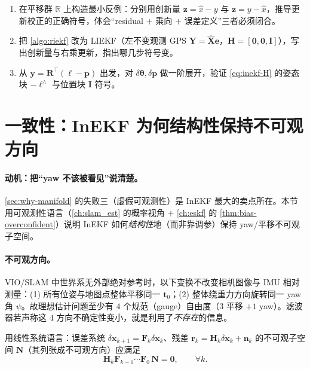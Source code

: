 \begin{practice}
\begin{enumerate}
  \item 在平移群 $\mathbb{R}$ 上构造最小反例：分别用创新量 $\mathbf{z}=\hat{x}-y$ 与 $\mathbf{z}=y-\hat{x}$，推导更新校正的正确符号，体会“residual $+$ 乘向 $+$ 误差定义”三者必须闭合。
  \item 把 \cref{algo:riekf} 改为 LIEKF（左不变观测 GPS $\mathbf{Y}=\hat{\mathbf{X}}\mathbf{e}$，$\mathbf{H}=[\mathbf{0},\mathbf{0},\mathbf{I}]$），写出创新量与右乘更新，指出哪几步符号变。
  \item 从 $\mathbf{y}=\mathbf{R}^\top(\boldsymbol{\ell}-\mathbf{p})$ 出发，对 $\delta\boldsymbol{\theta},\delta\mathbf{p}$ 做一阶展开，验证 \cref{eq:inekf-H} 的姿态块 $-\boldsymbol{\ell}^\wedge$ 与位置块 $\mathbf{I}$ 符号。
\end{enumerate}
\end{practice}

\section{一致性：InEKF 为何结构性保持不可观方向}
\label{sec:consistency-inekf}

\paragraph{动机：把“yaw 不该被看见”说清楚。}
\cref{sec:why-manifold} 的失败三（虚假可观测性）是 InEKF 最大的卖点所在。本节用可观测性语言（\cref{ch:slam_est} 的概率视角 $+$ \cref{ch:eskf} 的 \cref{thm:bias-overconfident}）说明 InEKF 如何\emph{结构性}地（而非靠调参）保持 yaw/平移不可观子空间。

\paragraph{不可观方向。}VIO/SLAM 中世界系无外部绝对参考时，以下变换不改变相机图像与 IMU 相对测量：(1) 所有位姿与地图点整体平移同一 $\mathbf{t}_0$；(2) 整体绕重力方向旋转同一 yaw 角 $\psi$。故理想估计问题至少有 $4$ 个规范（gauge）自由度（$3$ 平移 $+1$ yaw）。滤波器若声称这 $4$ 方向不确定性变小，就是利用了\emph{不存在}的信息。

用线性系统语言：误差系统 $\delta\mathbf{x}_{k+1}=\mathbf{F}_k\delta\mathbf{x}_k$、残差 $\mathbf{r}_k=\mathbf{H}_k\delta\mathbf{x}_k+\mathbf{n}_k$ 的不可观子空间 $\mathbf{N}$（其列张成不可观方向）应满足
\begin{equation}
  \mathbf{H}_k\mathbf{F}_{k-1}\cdots\mathbf{F}_0\,\mathbf{N}=\mathbf{0},\qquad\forall k.
  \label{eq:obs-null}
\end{equation}

